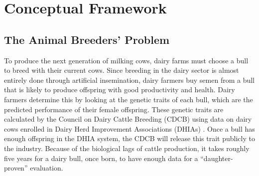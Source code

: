\documentclass[12pt,letterpaper]{article}
\begin{document}

\section{Conceptual Framework\label{sec:concept_frame}}

\subsection{The Animal Breeders' Problem}
To produce the next generation of milking cows, dairy farms must choose a bull to breed with their current cows.
Since breeding in the dairy sector is almost entirely done through artificial insemination, dairy farmers buy semen from a bull that is likely to produce offspring with good productivity and health.
Dairy farmers determine this by looking at the genetic traits of each bull, which are the predicted performance of their female offspring.
These genetic traits are calculated by the Council on Dairy Cattle Breeding (CDCB) using data on dairy cows enrolled in Dairy Herd Improvement Associations (DHIAs) \citep{Hutchins_Hueth2023}.
Once a bull has enough offspring in the DHIA system, the CDCB will release this trait publicly to the industry.
Because of the biological lags of cattle production, it takes roughly five years for a dairy bull, once born, to have enough data for a ``daughter-proven'' evaluation.
\end{document}
